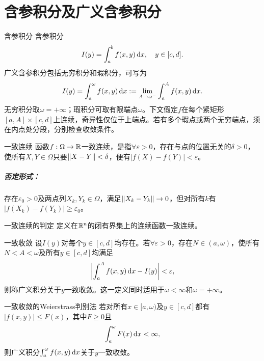 \chapter{含参积分及广义含参积分}
\begin{definition}{含参积分}{}
    含参积分
    \begin{equation}\label{eq:calc-parameter-integral}
        I(y) = \int_a^bf(x,y)\mathop{}\!\mathrm{d} x,\quad y \in [c,d].
    \end{equation}
    广义含参积分包括无穷积分和瑕积分，可写为
    \begin{equation}\label{eq:calc-improper-parameter-integral}
        I(y) = \int_a^\omega f(x,y)\mathop{}\!\mathrm{d} x := \lim_{A\to\omega^-}\int_a^Af(x,y)\mathop{}\!\mathrm{d} x.
    \end{equation}
    无穷积分取$\omega = +\infty$；瑕积分可取有限端点$\omega$。下文假定$f$在每个紧矩形$[a,A] \times [c,d]$上连续，奇异性仅位于上端点。若有多个瑕点或两个无穷端点，须在内点处分段，分别检查收敛条件。
\end{definition}
\begin{definition}{一致连续}{}
    函数$f:\Omega \to \mathbb{R}$一致连续，是指$\forall\varepsilon > 0$，存在与点的位置无关的$\delta > 0$，使所有$X,Y \in \Omega$只要$\lVert X - Y\rVert < \delta$，便有$|f(X) - f(Y)| < \varepsilon$。
    \tcblower
    \paragraph{否定形式：}存在$\varepsilon_0 > 0$及两点列$X_k,Y_k \in \Omega$，满足$\lVert X_k - Y_k\rVert \to 0$，但对所有$k$有$|f(X_k) - f(Y_k)| \geq \varepsilon_0$。
\end{definition}
\begin{theorem}{一致连续的判定}{}
    定义在$\mathbb{R}^n$的闭有界集上的连续函数一致连续。
\end{theorem}
\begin{definition}{一致收敛}{}
    设$I(y)$对每个$y \in [c,d]$均存在。若$\forall\varepsilon > 0$，存在$N \in (a,\omega)$，使所有$N < A < \omega$及所有$y \in [c,d]$均满足
    \begin{equation}\label{eq:calc-uniform-convergence}
        \biggl\lvert\int_a^Af(x,y)\mathop{}\!\mathrm{d} x - I(y)\biggr\rvert < \varepsilon,
    \end{equation}
    则称广义积分关于$y$一致收敛。这一定义同时适用于$\omega < \infty$和$\omega = +\infty$。
\end{definition}
\begin{theorem}{一致收敛的Weierstrass判别法}{}
    若对所有$x \in [a,\omega)$及$y \in [c,d]$都有$|f(x,y)| \leq F(x)$，其中$F \geq 0$且
    \[
        \int_a^\omega F(x)\mathop{}\!\mathrm{d} x < \infty,
    \]
    则广义积分$\textstyle \int_a^\omega f(x,y)\mathop{}\!\mathrm{d} x$关于$y$一致收敛。
\end{theorem}
